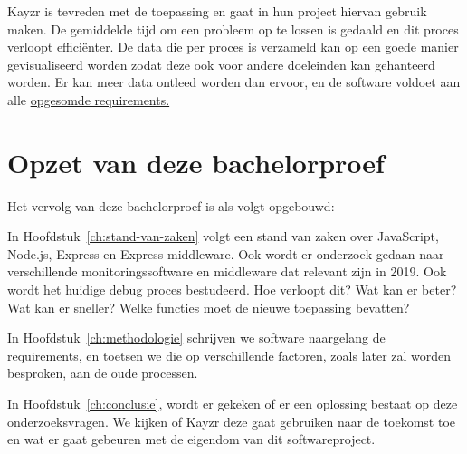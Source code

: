 Kayzr is tevreden met de toepassing en gaat in hun project hiervan gebruik maken. De gemiddelde tijd om een probleem op te lossen is gedaald en dit proces verloopt efficiënter. De data die per proces is verzameld kan op een goede manier gevisualiseerd worden zodat deze ook voor andere doeleinden kan gehanteerd worden. Er kan meer data ontleed worden dan ervoor, en de software voldoet aan alle \hyperref[sec:requirements]{opgesomde requirements. }


\section{Opzet van deze bachelorproef}
\label{sec:opzet-bachelorproef}


Het vervolg van deze bachelorproef is als volgt opgebouwd:

In Hoofdstuk~\ref{ch:stand-van-zaken} volgt een stand van zaken over JavaScript, Node.js, Express en Express middleware. Ook wordt er onderzoek gedaan naar verschillende monitoringssoftware en middleware dat relevant zijn in 2019. Ook wordt het huidige debug proces bestudeerd. Hoe verloopt dit? Wat kan er beter? Wat kan er sneller? Welke functies moet de nieuwe toepassing bevatten?

In Hoofdstuk~\ref{ch:methodologie} schrijven we software naargelang de requirements, en toetsen we die op verschillende factoren, zoals later zal worden besproken, aan de oude processen.


In Hoofdstuk~\ref{ch:conclusie}, wordt er gekeken of er een oplossing bestaat op deze onderzoeksvragen. We kijken of Kayzr deze gaat gebruiken naar de toekomst toe en wat er gaat gebeuren met de eigendom van dit softwareproject.

